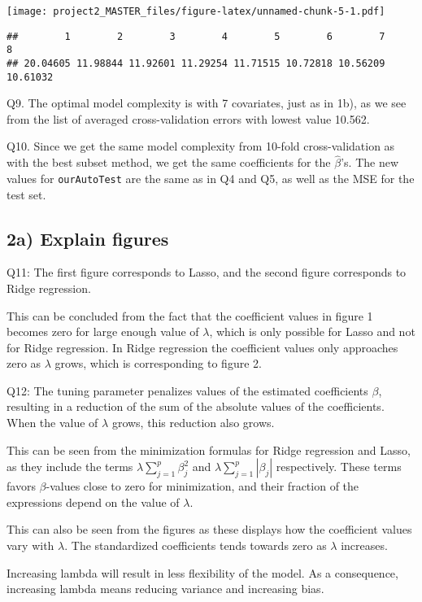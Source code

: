 \documentclass[]{article}
\begin{document}
\texttt{[image: project2\_MASTER\_files/figure-latex/unnamed-chunk-5-1.pdf]}

\begin{verbatim}
##        1        2        3        4        5        6        7        8 
## 20.04605 11.98844 11.92601 11.29254 11.71515 10.72818 10.56209 10.61032
\end{verbatim}

Q9. The optimal model complexity is with 7 covariates, just as in 1b),
as we see from the list of averaged cross-validation errors with lowest
value 10.562.

Q10. Since we get the same model complexity from 10-fold
cross-validation as with the best subset method, we get the same
coefficients for the \(\hat\beta\)'s. The new values for
\texttt{ourAutoTest} are the same as in Q4 and Q5, as well as the MSE
for the test set.

\subsection{2a) Explain figures}\label{a-explain-figures}

Q11: The first figure corresponds to Lasso, and the second figure
corresponds to Ridge regression.

This can be concluded from the fact that the coefficient values in
figure 1 becomes zero for large enough value of \(\lambda\), which is
only possible for Lasso and not for Ridge regression. In Ridge
regression the coefficient values only approaches zero as \(\lambda\)
grows, which is corresponding to figure 2.

Q12: The tuning parameter penalizes values of the estimated coefficients
\(\beta\), resulting in a reduction of the sum of the absolute values of
the coefficients. When the value of \(\lambda\) grows, this reduction
also grows.

This can be seen from the minimization formulas for Ridge regression and
Lasso, as they include the terms \(\lambda \sum_{j=1}^p \beta_j^2\) and
\(\lambda \sum_{j=1}^p |\beta_j|\) respectively. These terms favors
\(\beta\)-values close to zero for minimization, and their fraction of
the expressions depend on the value of \(\lambda\).

This can also be seen from the figures as these displays how the
coefficient values vary with \(\lambda\). The standardized coefficients
tends towards zero as \(\lambda\) increases.

Increasing lambda will result in less flexibility of the model. As a
consequence, increasing lambda means reducing variance and increasing
bias.
\end{document}
